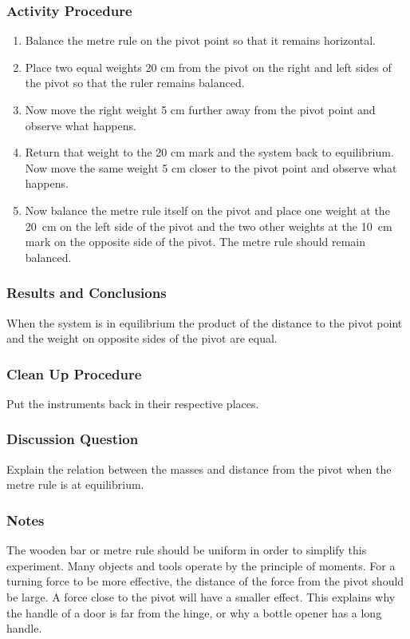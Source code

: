 \subsubsection*{Activity Procedure}
\begin{enumerate}
\item{Balance the metre rule on the pivot point so that it remains horizontal.} 
\item{Place two equal weights 20 cm from the pivot on the right and left sides of the pivot so that the ruler remains balanced.} 
\item{Now move the right weight 5 cm further away from the pivot point and observe what happens.} 
\item{Return that weight to the 20 cm mark and the system back to equilibrium. Now move the same weight 5 cm closer to the pivot point and observe what happens.} 
\item{Now balance the metre rule itself on the pivot and place one weight at the 20~cm on the left side of the pivot and the two other weights at the 10~cm mark on the opposite side of the pivot. The metre rule should remain balanced.} 
\end{enumerate}

\subsubsection*{Results and Conclusions}
When the system is in equilibrium the product of the distance to the pivot point and the weight on opposite sides of the pivot are equal.  

\subsubsection*{Clean Up Procedure}
Put the instruments back in their respective places.

\subsubsection*{Discussion Question}
Explain the relation between the masses and distance from the pivot when the metre rule is at equilibrium.

\subsubsection*{Notes}
The wooden bar or metre rule should be uniform in order to simplify this experiment.
Many objects and tools operate by the principle of moments.  For a turning force to be more effective, the distance of the force from the pivot should be large.  A force close to the pivot will have a smaller effect.  This explains why the handle of a door is far from the hinge, or why a bottle opener has a long handle.



